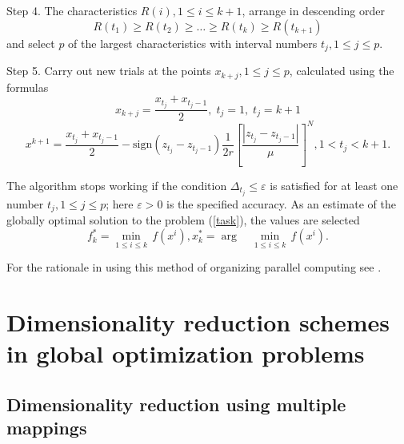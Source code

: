 \documentclass{svproc}
\begin{document}
Step 4. The characteristics \(R(i),1\leqslant i\leqslant k+1\), arrange in descending order 
\begin{displaymath}
\label{step4}
R(t_1)\geqslant R(t_2)\geqslant \dots \geqslant R(t_{k})\geqslant R(t_{k+1})
\end{displaymath}
and select \(p\) of the largest characteristics with interval numbers \(t_j,1\leqslant j\leqslant p\).

Step 5. Carry out new trials at the points \(x_{k+j},1\leqslant j\leqslant p\), calculated using the formulas
\begin{displaymath}
x_{k+j}=\dfrac{x_{t_j}+x_{t_j-1}}{2},\; t_j=1, \; t_j=k+1
\end{displaymath}
\begin{displaymath}
\label{step5}
{{x}^{k+1}}=\frac{{{x}_{{{t}_{j}}}}+{{x}_{{{t}_{j}}-1}}}{2}-\text{sign}({{z}_{{{t}_{j}}}}-{{z}_{{{t}_{j}}-1}})\frac{1}{2r}{{\left[ \frac{|{{z}_{{{t}_{j}}}}-{{z}_{{{t}_{j}}-1}}|}{\mu } \right]}^{N}}, 1<{{t}_{j}}<k+1.
\end{displaymath}

The algorithm stops working if the condition \(\Delta_{t_j}\leqslant \varepsilon\)  is satisfied for at least one number \(t_j,1\leqslant j\leqslant p\); here \(\varepsilon>0\)  is the specified accuracy. As an estimate of the globally optimal solution to the problem (\ref{task}), the values are selected 
\begin{displaymath}
f_{k}^{*}=\underset{1\le i\le k}{\mathop{\min }}\,f({{x}^{i}}),   x_{k}^{*}=\arg \quad \underset{1\le i\le k}{\mathop{\min }}\,f({{x}^{i}}).
\end{displaymath}

For the rationale in using this method of organizing parallel computing see \cite{Strongin2000}. 

\section{Dimensionality reduction schemes in global optimization problems}

\subsection{Dimensionality reduction using multiple mappings}
\end{document}
